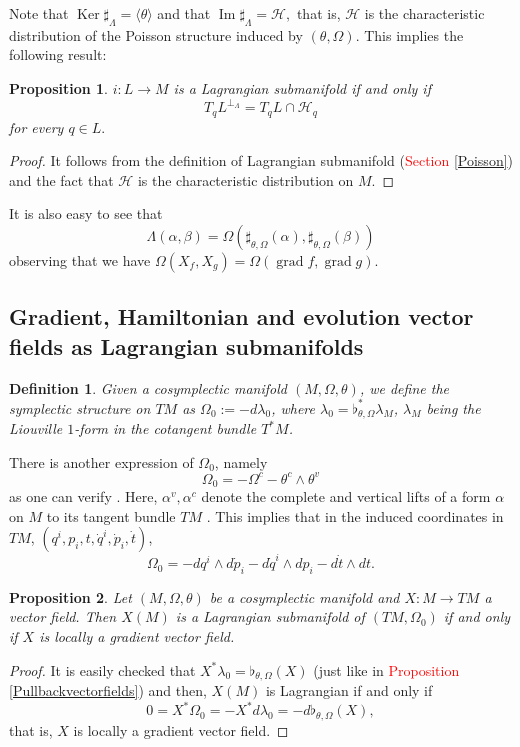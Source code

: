 \documentclass[12pt]{article}
\newtheorem{prop}{Proposition}[section]
\newtheorem{Def}{Definition}[section]
\renewcommand{\ker}{\operatorname{Ker}}
\newcommand{\im}{\operatorname{Im}}
\newcommand{\grad}{\operatorname{grad}}
\begin{document}
Note that $\ker \sharp_\Lambda = \langle \theta \rangle $ and that $\im \sharp_\Lambda = \mathcal{H},$ that is, $\mathcal{H}$ is the characteristic 
distribution of the Poisson structure induced by $(\theta, \Omega)$. This implies the following result:\\
\begin{prop} $i: L \rightarrow M$ is a Lagrangian submanifold if and only if $$T_qL^{\perp_\Lambda} = T_qL  \cap \mathcal{H}_q$$ for every $q \in L.$
\end{prop}
\begin{proof} It follows from the definition of Lagrangian submanifold (\textcolor{red}{Section \ref{Poisson}}) and the fact that $\mathcal{H}$ is the characteristic distribution on $M$.
\end{proof}
It is also easy to see that $$\Lambda(\alpha, \beta) = \Omega(\sharp_{\theta, \Omega}(\alpha),\sharp_{\theta, \Omega}( \beta) )$$ observing that we have $\Omega(X_f,X_g) = \Omega(\grad f, \grad g)$. \\


\subsection[Hamiltonian vector fields as Lagrangian submanifolds]{Gradient, Hamiltonian and evolution vector fields as Lagrangian submanifolds}
\begin{Def} Given a cosymplectic manifold $(M, \Omega, \theta)$, we define the symplectic structure on $TM$ as $\Omega_0 := - d\lambda_0$, where $\lambda_0 = \flat_{\theta,\Omega}^*\lambda_M$, $\lambda_M$ being the Liouville $1$-form in the cotangent bundle $T^*M$.
\end{Def}

There is another expression of $\Omega_0$, namely $$\Omega_0 = -\Omega^c -\theta^c \wedge \theta^v$$ as one can verify \cites{cantrijn1992gradient}. Here, $\alpha^v, \alpha^c$ denote the complete and vertical lifts of a form $\alpha$ on $M$ to its tangent bundle $TM$ \cites{de2011methods}. This implies that in the induced coordinates in $TM$, $(q^i,p_i, t, \dot{q}^i, \dot{p}_i, \dot{t})$, $$\Omega_0 = -dq^i \wedge d\dot{p}_i - d\dot{q}^i \wedge dp_i - d \dot{t} \wedge dt.$$

\begin{prop} Let $(M, \Omega, \theta)$ be a cosymplectic manifold and $X: M \rightarrow TM$ a vector field. Then $X(M)$ is a Lagrangian submanifold of $(TM, \Omega_0)$ if and only if $X$ is locally a gradient vector field.
\end{prop}
\begin{proof}It is easily checked that $X^*\lambda_0 = \flat_{\theta,\Omega}(X)$ (just like in \textcolor{red}{Proposition \ref{Pullbackvectorfields}}) and then, $X(M)$ is Lagrangian if and only if $$0 = X^*\Omega_0 = -X^* d\lambda_0= -   d\flat_{\theta,\Omega}(X),$$ that is, $X$ is locally a gradient vector field.
\end{proof}
\end{document}
